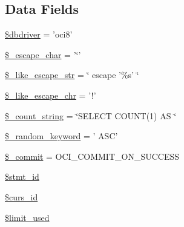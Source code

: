 \subsection*{Data Fields}
\begin{DoxyCompactItemize}
\item 
\hyperlink{class_c_i___d_b__oci8__driver_a0cde2a16322a023d040aa7f725877597}{\$dbdriver} = 'oci8'
\item 
\hyperlink{class_c_i___d_b__oci8__driver_aaec2fb0112850159063a8e47ad3aed6e}{\$\-\_\-escape\-\_\-char} = '\char`\"{}'
\item 
\hyperlink{class_c_i___d_b__oci8__driver_adf86ecadf3d0e1ce3f5e0eaeeb3867ae}{\$\-\_\-like\-\_\-escape\-\_\-str} = \char`\"{} escape '\%s' \char`\"{}
\item 
\hyperlink{class_c_i___d_b__oci8__driver_a668acfd923d0342389cd3a614628cf2a}{\$\-\_\-like\-\_\-escape\-\_\-chr} = '!'
\item 
\hyperlink{class_c_i___d_b__oci8__driver_a06c80bac2ecbd0557827e96949c23097}{\$\-\_\-count\-\_\-string} = \char`\"{}S\-E\-L\-E\-C\-T C\-O\-U\-N\-T(1) A\-S \char`\"{}
\item 
\hyperlink{class_c_i___d_b__oci8__driver_a10213aa6e05f6d924d3277bb1d2fea00}{\$\-\_\-random\-\_\-keyword} = ' A\-S\-C'
\item 
\hyperlink{class_c_i___d_b__oci8__driver_ad068581ef6fdb05bd46df66870beef79}{\$\-\_\-commit} = O\-C\-I\-\_\-\-C\-O\-M\-M\-I\-T\-\_\-\-O\-N\-\_\-\-S\-U\-C\-C\-E\-S\-S
\item 
\hyperlink{class_c_i___d_b__oci8__driver_a1a97f17fd259cd27c73b65e6c3706ec0}{\$stmt\-\_\-id}
\item 
\hyperlink{class_c_i___d_b__oci8__driver_a75e7d18ad2e68ace3813533c9da2e179}{\$curs\-\_\-id}
\item 
\hyperlink{class_c_i___d_b__oci8__driver_a96df35d7e3e76bef21ebb80234fe59e8}{\$limit\-\_\-used}
\end{DoxyCompactItemize}
